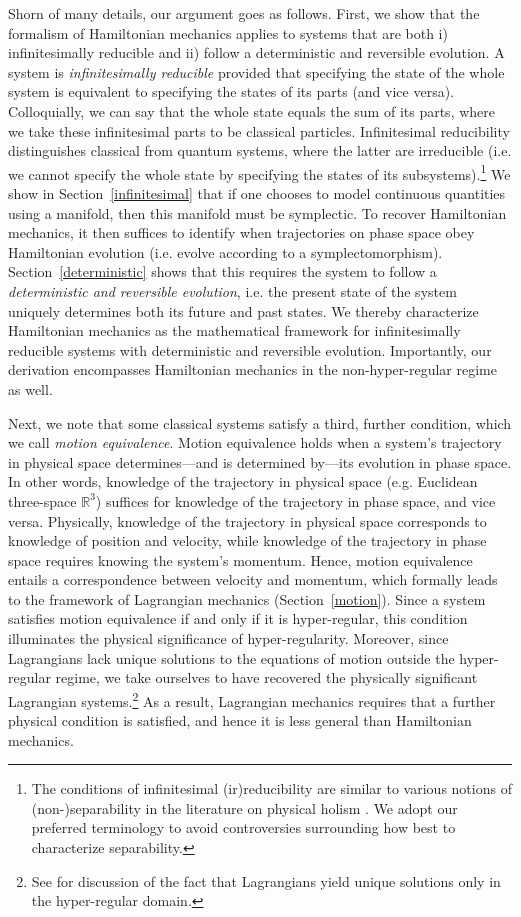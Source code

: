 \documentclass[12pt, twoside]{article}
\begin{document}
Shorn of many details, our argument goes as follows. First, we show that the formalism of Hamiltonian mechanics applies to systems that are both i) infinitesimally reducible and ii) follow a deterministic and reversible evolution. A system is \textit{infinitesimally reducible} provided that specifying the state of the whole system is equivalent to specifying the states of its parts (and vice versa). Colloquially, we can say that the whole state equals the sum of its parts, where we take these infinitesimal parts to be classical particles. Infinitesimal reducibility distinguishes classical from quantum systems, where the latter are irreducible (i.e. we cannot specify the whole state by specifying the states of its subsystems).\footnote{The conditions of infinitesimal (ir)reducibility are similar to various notions of (non-)separability in the literature on physical holism \parencites[46, 124]{Healey}. We adopt our preferred terminology to avoid controversies surrounding how best to characterize separability.} We show in Section~\ref{infinitesimal} that if one chooses to model continuous quantities using a manifold, then this manifold must be symplectic. To recover Hamiltonian mechanics, it then suffices to identify when trajectories on phase space obey Hamiltonian evolution (i.e. evolve according to a symplectomorphism). Section~\ref{deterministic} shows that this requires the system to follow a \textit{deterministic and reversible evolution}, i.e. the present state of the system uniquely determines both its future and past states. We thereby characterize Hamiltonian mechanics as the mathematical framework for infinitesimally reducible systems with deterministic and reversible evolution. Importantly, our derivation encompasses Hamiltonian mechanics in the non-hyper-regular regime as well.

Next, we note that some classical systems satisfy a third, further condition, which we call \textit{motion equivalence}. Motion equivalence holds when a system's trajectory in physical space determines---and is determined by---its evolution in phase space. In other words, knowledge of the trajectory in physical space (e.g. Euclidean three-space $\mathbb{R}^3$) suffices for knowledge of the trajectory in phase space, and vice versa. Physically, knowledge of the trajectory in physical space corresponds to knowledge of position and velocity, while knowledge of the trajectory in phase space requires knowing the system's momentum. Hence, motion equivalence entails a correspondence between velocity and momentum, which formally leads to the framework of Lagrangian mechanics (Section~\ref{motion}). Since a system satisfies motion equivalence if and only if it is hyper-regular, this condition illuminates the physical significance of hyper-regularity. Moreover, since Lagrangians lack unique solutions to the equations of motion outside the hyper-regular regime, we take ourselves to have recovered the physically significant Lagrangian systems.\footnote{See \textcites[119]{Gelfand} for discussion of the fact that Lagrangians yield unique solutions only in the hyper-regular domain.} As a result, Lagrangian mechanics requires that a further physical condition is satisfied, and hence it is less general than Hamiltonian mechanics. 
\end{document}
